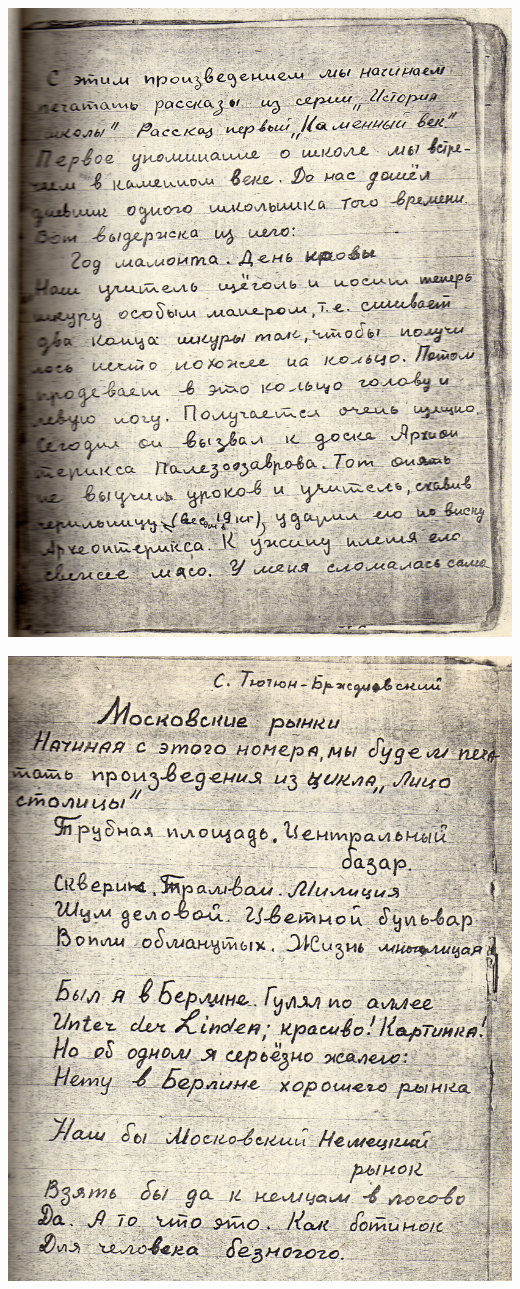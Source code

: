 \noindent
\includegraphics[width=\textwidth]{inc/Vynd/Vynd008}

\newpage

\noindent
\includegraphics[width=\textwidth]{inc/Vynd/Vynd009}

